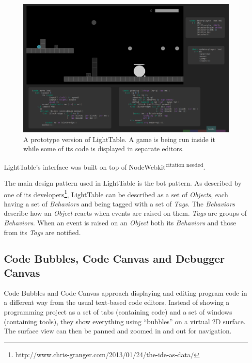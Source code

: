 \documentclass{./llncs2e/llncs}
\begin{document}

	\begin{figure}
	  \centering
	  \includegraphics[width=1.0\textwidth]{img/lt_game_example}
	    \caption{A prototype version of LightTable. A game is being run inside it while some of its code is displayed in separate editors.}
	  \label{fig:lt:draft:table}
	\end{figure} 

	LightTable's interface was built on top of NodeWebkit\textsuperscript{citation needed}.

	The main design pattern used in LightTable is the \ac{bot} pattern. As described by one of its developers\footnote{http://www.chris-granger.com/2013/01/24/the-ide-as-data/}, LightTable can be described as a set of \emph{Objects}, each having a set of \emph{Behaviors} and being tagged with a set of \emph{Tags}. The \emph{Behaviors} describe how an \emph{Object} reacts when events are raised on them. \emph{Tags} are groups of \emph{Behaviors}. When an event is raised on an \emph{Object} both its \emph{Behaviors} and those from its \emph{Tags} are notified.


\subsection{Code Bubbles, Code Canvas and Debugger Canvas}
	Code Bubbles and Code Canvas approach displaying and editing program code in a different way from the usual text-based code editors. Instead of showing a programming project as a set of tabs (containing code) and a set of windows (containing tools), they show everything using ``bubbles'' on a virtual 2D surface. The surface view can then be panned and zoomed in and out for navigation.
\end{document}
